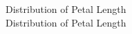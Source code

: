\documentclass{article}
\begin{document}
  \textsf{Distribution of Petal Length} \\
  Distribution of Petal Length
\end{document}
